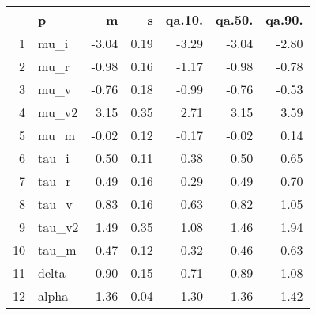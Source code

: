 \begin{table}[ht]
\centering
\begin{tabular}{rlrrrrr}
  \hline
 & p & m & s & qa.10. & qa.50. & qa.90. \\ 
  \hline
1 & mu\_i & -3.04 & 0.19 & -3.29 & -3.04 & -2.80 \\ 
  2 & mu\_r & -0.98 & 0.16 & -1.17 & -0.98 & -0.78 \\ 
  3 & mu\_v & -0.76 & 0.18 & -0.99 & -0.76 & -0.53 \\ 
  4 & mu\_v2 & 3.15 & 0.35 & 2.71 & 3.15 & 3.59 \\ 
  5 & mu\_m & -0.02 & 0.12 & -0.17 & -0.02 & 0.14 \\ 
  6 & tau\_i & 0.50 & 0.11 & 0.38 & 0.50 & 0.65 \\ 
  7 & tau\_r & 0.49 & 0.16 & 0.29 & 0.49 & 0.70 \\ 
  8 & tau\_v & 0.83 & 0.16 & 0.63 & 0.82 & 1.05 \\ 
  9 & tau\_v2 & 1.49 & 0.35 & 1.08 & 1.46 & 1.94 \\ 
  10 & tau\_m & 0.47 & 0.12 & 0.32 & 0.46 & 0.63 \\ 
  11 & delta & 0.90 & 0.15 & 0.71 & 0.89 & 1.08 \\ 
  12 & alpha & 1.36 & 0.04 & 1.30 & 1.36 & 1.42 \\ 
   \hline
\end{tabular}
\label{tab:param}
\end{table}
